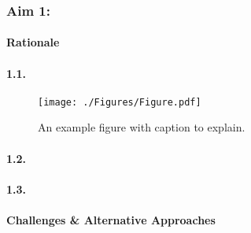 \newcommand{\FigInc}{%
\begin{wrapfigure}{R}{3.05in}
  \begin{mdframed}
  \texttt{[image: ./Figures/Figure.pdf]}
  \caption{An example figure with caption to explain.}
  \label{incFigure}
  \end{mdframed}
\end{wrapfigure}}

\subsubsection{Aim 1: \SpecificAimOne}

\paragraph{Rationale}

\lipsum[1-1]

\paragraph{1.1. \SpecificAimOneA}

\FigInc
\lipsum[2-2]

\paragraph{1.2. \SpecificAimOneB}

\lipsum[3-3]

\paragraph{1.3. \SpecificAimOneC}

\lipsum[4-4]

\paragraph{Challenges \& Alternative Approaches}

\lipsum[6-6]
